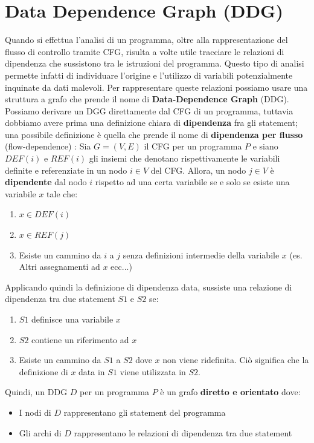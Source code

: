 \documentclass[../main.tex]{subfiles}
\begin{document}
\section{Data Dependence Graph (DDG)}
Quando si effettua l'analisi di un programma, oltre alla rappresentazione del flusso di controllo tramite CFG, risulta a volte utile tracciare le relazioni di dipendenza che sussistono tra le istruzioni del programma.
Questo tipo di analisi permette infatti di individuare l'origine e l'utilizzo di variabili potenzialmente inquinate da dati malevoli. Per rappresentare queste relazioni possiamo usare una struttura a grafo che prende il nome
di \textbf{Data-Dependence Graph} (DDG). Possiamo derivare un DGG direttamente dal CFG di un programma, tuttavia dobbiamo avere prima una definizione chiara di \textbf{dipendenza} fra gli statement; una possibile definizione è quella che prende il nome di \textbf{dipendenza per flusso} (flow-dependence) \cite{DDG}:
Sia $G = (V, E)$ il CFG per un programma $P$ e siano $DEF(i)$ e $REF(i)$ gli insiemi che denotano rispettivamente le variabili definite e referenziate in un nodo $i \in V$ del CFG.
Allora, un nodo $j \in V$ è \textbf{dipendente} dal nodo $i$ rispetto ad una certa variabile se e solo se esiste una variabile $x$ tale che:
\begin{enumerate}
    \item $x \in DEF(i)$
    \item $x \in REF(j)$
    \item Esiste un cammino da $i$ a $j$ senza definizioni intermedie della variabile $x$ (es. Altri assegnamenti ad $x$ ecc...)
\end{enumerate} 
Applicando quindi la definizione di dipendenza data, sussiste una relazione di dipendenza tra due statement $S1$ e $S2$ se:
\begin{enumerate}
    \item $S1$ definisce una variabile $x$
    \item $S2$ contiene un riferimento ad $x$
    \item Esiste un cammino da $S1$ a $S2$ dove $x$ non viene ridefinita. Ciò significa che la definizione di $x$ data in $S1$ viene utilizzata in $S2$.  
\end{enumerate}
Quindi, un DDG $D$ per un programma $P$ è un grafo \textbf{diretto e orientato} dove:
\begin{itemize}
    \item I nodi di $D$ rappresentano gli statement del programma
    \item Gli archi di $D$ rappresentano le relazioni di dipendenza tra due statement
\end{itemize}
\end{document}
